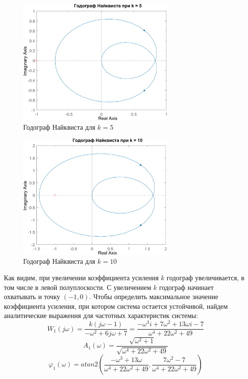 \begin{figure}[H]
    \centering
    \centering
    \includegraphics[width=0.7\textwidth, trim={0cm 0cm 0cm 0cm}]{../images/2_1_2_hod.png}
    \caption{Годограф Найквиста для $k = 5$}
\end{figure}

\begin{figure}[H]
    \centering
    \centering
    \includegraphics[width=0.7\textwidth, trim={0cm 0cm 0cm 0cm}]{../images/2_1_3_hod.png}
    \caption{Годограф Найквиста для $k = 10$}
\end{figure}

Как видим, при увеличении коэффициента усиления $k$ годограф увеличивается, в том числе в левой полуплоскости. 
С увеличением $k$ годограф начинает охватывать и точку $(-1, 0)$. Чтобы определить максимальное значение
коэффициента усиления, при котором система остается устойчивой, найдем аналитические выражения для 
частотных характеристик системы:
\[
W_1(j\omega) = \frac{k(j\omega - 1)}{-\omega^2 + 6j\omega + 7} = \frac{-\omega^3i + 7\omega^2 +13\omega i - 7}{\omega^4 + 22\omega^2 + 49}
\]
\[
A_1(\omega) = \frac{\sqrt{\omega^2+1}}{\sqrt{\omega^4 + 22\omega^2 + 49}}
\]
\[
\varphi_1(\omega) = atan2\left(\frac{-\omega^3 + 13\omega}{\omega^4 + 22\omega^2 + 49},\frac{7\omega^2 - 7}{\omega^4 + 22\omega^2 + 49}\right)
\]

